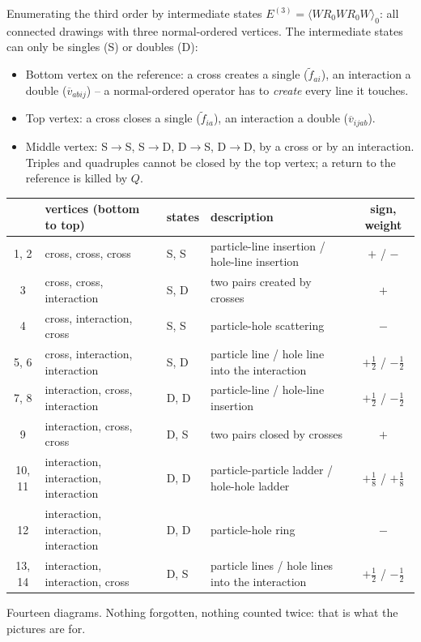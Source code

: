 \documentclass[aspectratio=169,10pt]{beamer}
\newcommand{\av}[1]{\langle #1\rangle_0}
\newcommand{\vbar}[4]{\overline v_{#1#2#3#4}}
\newcommand{\ftil}[1]{\tilde f_{#1}}
\begin{document}
\begin{frame}[shrink=12]{Enumerating the third order by intermediate states}
\(E^{(3)}=\av{WR_0WR_0W}\): all connected drawings with three normal-ordered vertices. The intermediate states can only be \alert{singles} (S) or \alert{doubles} (D):
\begin{itemize}
\item Bottom vertex on the reference: a cross creates a single (\(\ftil{ai}\)), an interaction a double (\(\vbar{a}{b}{i}{j}\)) -- a normal-ordered operator has to \emph{create} every line it touches.
\item Top vertex: a cross closes a single (\(\ftil{ia}\)), an interaction a double (\(\vbar{i}{j}{a}{b}\)).
\item Middle vertex: S\(\to\)S, S\(\to\)D, D\(\to\)S, D\(\to\)D, by a cross or by an interaction. Triples and quadruples cannot be closed by the top vertex; a return to the reference is killed by \(Q\).
\end{itemize}
\begin{center}\scriptsize
\begin{tabular}{clllc}
\toprule
& vertices (bottom to top) & states & description & sign, weight\\
\midrule
1, 2 & cross, cross, cross & S, S & particle-line insertion / hole-line insertion & \(+\) / \(-\)\\
3 & cross, cross, interaction & S, D & two pairs created by crosses & \(+\)\\
4 & cross, interaction, cross & S, S & particle-hole scattering & \(-\)\\
5, 6 & cross, interaction, interaction & S, D & particle line / hole line into the interaction & \(+\tfrac12\) / \(-\tfrac12\)\\
7, 8 & interaction, cross, interaction & D, D & particle-line / hole-line insertion & \(+\tfrac12\) / \(-\tfrac12\)\\
9 & interaction, cross, cross & D, S & two pairs closed by crosses & \(+\)\\
10, 11 & interaction, interaction, interaction & D, D & particle-particle ladder / hole-hole ladder & \(+\tfrac18\) / \(+\tfrac18\)\\
12 & interaction, interaction, interaction & D, D & particle-hole ring & \(-\)\\
13, 14 & interaction, interaction, cross & D, S & particle lines / hole lines into the interaction & \(+\tfrac12\) / \(-\tfrac12\)\\
\bottomrule
\end{tabular}
\end{center}
\alert{Fourteen diagrams.} Nothing forgotten, nothing counted twice: that is what the pictures are for.
\end{frame}
\end{document}
